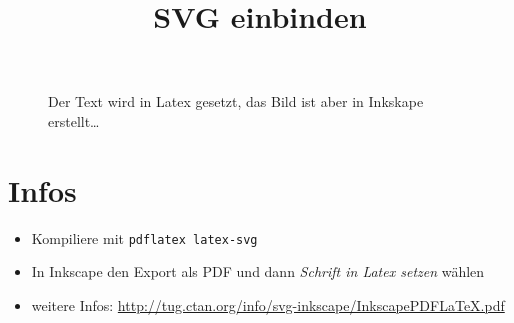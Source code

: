 \documentclass{scrartcl}
\title{SVG einbinden}
\author{}
\begin{document}
\maketitle

\Blindtext

\begin{figure}
    \centering
    \def\svgwidth{.4\columnwidth}
    
    \caption{Der Text wird in Latex gesetzt, das Bild ist aber in Inkskape
    erstellt\dots}
\end{figure}

\section*{Infos}

\begin{itemize}
    \item Kompiliere mit \texttt{pdflatex latex-svg}
    \item In Inkscape den Export als PDF und dann \emph{Schrift in
        Latex setzen} wählen 
    \item weitere Infos:
        \url{http://tug.ctan.org/info/svg-inkscape/InkscapePDFLaTeX.pdf}
\end{itemize}
\end{document}
